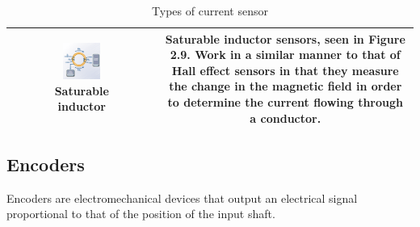 \begin{table}[H]
\begin{tabular}{|c|c|}
          \begin{minipage}[b]{0.45\textwidth}
          \begin{figure}[H]
            \centering
            \includegraphics[width=0.5\textwidth]{saturable_inductor.png}
            \caption{Saturable inductor}
            \label{fig:Saturable}
          \end{figure}
          \end{minipage}
         &  
           \begin{minipage}[b]{0.45\textwidth}
            \textbf{Saturable inductor sensors}, seen in Figure 2.9. Work in a similar manner to that of Hall effect sensors in that they measure the change in the magnetic field in order to determine the current flowing through a conductor.
            \vspace{6mm}
          \end{minipage}
         \\
     \hline
    \end{tabular}
    \vspace{2mm}
    \caption{Types of current sensor}
\end{table}


\newpage
\subsection{Encoders}
Encoders are electromechanical devices that output an electrical signal proportional to that of the position of the input shaft.

